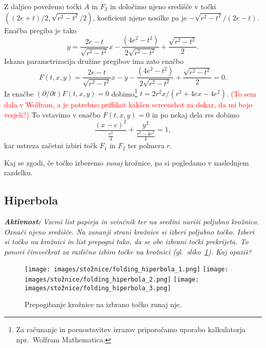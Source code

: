 Z daljico povežemo točki $A$ in $F_2$ in določimo njeno središče v točki $((2e+t)/2, \sqrt{r^2-t^2}/2)$, koeficient njene nosilke pa je $ - \sqrt{r^2-t^2}/(2e-t)$. Enačba pregiba je tako
\begin{equation*}
    \label{eq:tangenta_elipsa}
    y = \frac{2e-t}{\sqrt{r^2-t^2}} x - \frac{(4e^2-t^2)}{2\sqrt{r^2-t^2}} + \frac{\sqrt{r^2-t^2}}{2}.
\end{equation*}
Iskana parametrizacija družine pregibov ima zato enačbo
\begin{equation}
    \label{eq:param_elipsa}
    F(t,x,y) = \frac{2e-t}{\sqrt{r^2-t^2}} x - y - \frac{(4e^2-t^2)}{2\sqrt{r^2-t^2}} + \frac{\sqrt{r^2-t^2}}{2} = 0.
\end{equation}
Iz enačbe $(\partial / \partial t) F(t, x, y) = 0$ dobimo\footnote{Za računanje in poenostavitev izrazov priporočamo uporabo kalkulatorja npr.\ Wolfram Mathematica.} $t = 2r^2x/(r^2+4ex-4e^2)$. \textcolor{red}{(To sem dala v Wolfram, a je potrebno priflikat kakšen screenshot za dokaz, da mi bojo verjeli?)} To vstavimo v enačbo $F(t,x,y)=0$ in po nekaj dela res dobimo
\begin{equation*}
    \frac{(x-e)^2}{\frac{r^2}{4}} + \frac{y^2}{\frac{r^2-4e^2}{4}} = 1,
\end{equation*}
kar ustreza začetni izbiri točk $F_1$ in $F_2$ ter polmera $r$.

Kaj se zgodi, če točko izberemo \emph{zunaj} krožnice, pa si pogledamo v naslednjem razdelku.

\subsection{Hiperbola}

\textit{\textbf{Aktivnost:} Vzemi list papirja in svinčnik ter na sredini nariši poljubno krožnico. Označi njeno središče. Na zunanji strani krožnice si izberi poljubno točko. Izberi si točko na krožnici in list prepogni tako, da se obe izbrani točki prekrijeta. To ponovi čimvečkrat za različno izbiro točke na krožnici (gl.\ sliko~\ref{fig:koraki_hiperbola}). Kaj opaziš?}

\begin{figure}[h]
    \centering
    \texttt{[image: images/stožnice/folding\_hiperbola\_1.png]}
    \texttt{[image: images/stožnice/folding\_hiperbola\_2.png]}
    \texttt{[image: images/stožnice/folding\_hiperbola\_3.png]}
    \caption[Prepogibanje hiperbole]{Prepogibanje krožnice na izbrano točko zunaj nje.}
    \label{fig:koraki_hiperbola}
\end{figure}

